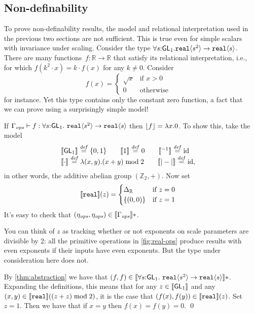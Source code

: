 \subsection{Non-definability}
\label{sec:types-indexed-abelian-groups-indef}

\newcommand{\Grp}{\mathit{Gr}}
To prove non-definability results, the model and relational interpretation
used in the previous two sections are not sufficient.
This is true even for simple scalars with invariance under scaling.
Consider the type 
$\forall s \mathord: \mathsf{GL}_1.\textup{\texttt{real}}\langle s^2 \rangle \to \textup{\texttt{real}}\langle s \rangle$. 
There are many functions~$f: \mathbb R \to \mathbb R$
that satisfy its relational interpretation, i.e., for which $f(k^2\cdot x) = k\cdot f(x)$ for 
any $k\neq 0$.
Consider 
\[
f(x) = \begin{cases}\sqrt x & \text{if }x > 0\\0&\text{otherwise}\end{cases}
\]
for instance. Yet this type contains only the constant zero function, a fact that
we can prove using a surprisingly simple model!

\begin{example}\label{ex:sqrt-root-nondef}
If  $\Gamma_{\mathit{ops}} \vdash f : \forall s \mathord: \mathsf{GL}_1.\
\textup{\texttt{real}}\langle s^2 \rangle \to \textup{\texttt{real}}\langle s \rangle$ 
then $\left\lfloor{f}\right\rfloor = \lambda x.0$.
To show this, take the model
\[
\begin{array}{l}
\llbracket \mathsf{GL}_1 \rrbracket \stackrel{\mathit{def}}= \{0,1\}\qquad
\llbracket 1 \rrbracket \stackrel{\mathit{def}}= 0 \qquad
\llbracket {}^{-1} \rrbracket  \stackrel{\mathit{def}}= \mathrm{id}\\
\llbracket \cdot \rrbracket \stackrel{\mathit{def}}= \lambda(x,y).(x+y)\mathrel{\mathrm{mod}} 2
\qquad
\llbracket |-| \rrbracket \stackrel{\mathit{def}}= \mathrm{id},

\end{array}
\]
in other words, the additive abelian group $(\mathbb Z_2, +)$. 
Now set
\[
\llbracket \textup{\texttt{real}} \rrbracket(z) = 
  \begin{cases} \Delta_{\mathbb R} & \text{if }z=0\\
                      \{(0,0)\} & \text{if }z=1
\end{cases}
\]
It's easy to check that $(\eta_{\mathit{ops}},\eta_{\mathit{ops}})\in\llbracket \Gamma_{\mathit{ops}} \rrbracket*$.

You can think of $z$ as tracking whether or not exponents on scale
parameters are divisible by 2: all the primitive operations in
\autoref{fig:real-ops} produce results with even exponents if their
inputs have even exponents. But the type under consideration here does
not.

By \autoref{thm:abstraction} we have that $(f,f)\in\llbracket \forall s
  \mathord: \mathsf{GL}_1.\ \textup{\texttt{real}}\langle s^2 \rangle \to \textup{\texttt{real}}\langle s \rangle \rrbracket *$.
Expanding the definitions, this means that for any
$z\in\llbracket \mathsf{GL}_1 \rrbracket$ and any
$(x,y)\in\llbracket \textup{\texttt{real}} \rrbracket((z+z)\mathrel\textrm{mod}2)$, it is the case that
$(f(x),f(y))\in\llbracket \textup{\texttt{real}} \rrbracket(z)$. Set $z = 1$.  
Then we have that if $x=y$ then $f(x)=f(y)=0$.
\qed
\end{example}


